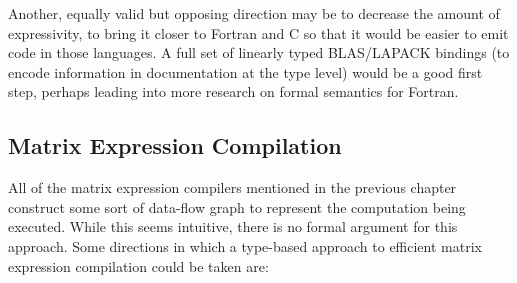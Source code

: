 Another, equally valid but opposing direction may be to decrease the amount of
expressivity, to bring it closer to Fortran and C so that it would be easier to
emit code in those languages. A full set of linearly typed BLAS/LAPACK bindings
(to encode information in documentation at the type level) would be a good
first step, perhaps leading into more research on formal semantics for Fortran.

\subsection{Matrix Expression Compilation}

All of the matrix expression compilers mentioned in the previous chapter
construct some sort of data-flow graph to represent the computation being
executed. While this seems intuitive, there is no formal argument for this
approach.  Some directions in which a type-based approach to efficient matrix
expression compilation could be taken are:

